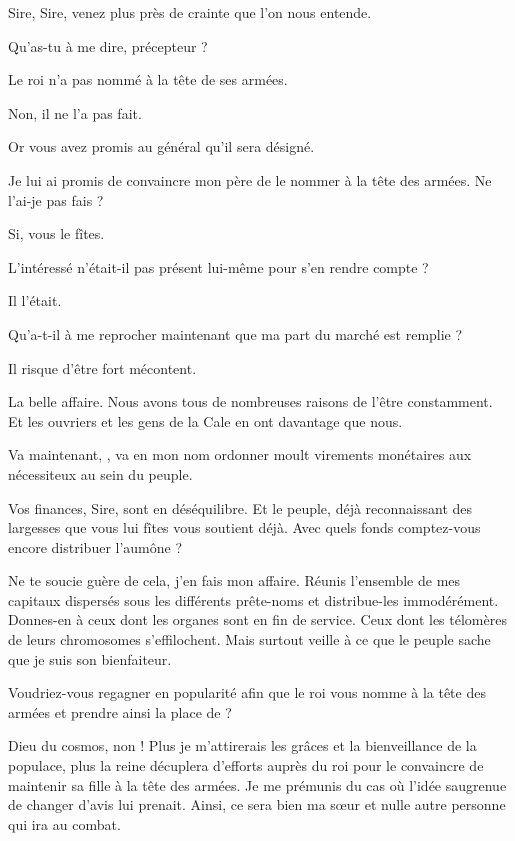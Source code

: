 \begin{drama}
  \alexasspeaks Sire, Sire, venez plus près de crainte que l’on nous entende.

  \elenaspeaks Qu’as-tu à me dire, précepteur ?

  \alexasspeaks Le roi n’a pas nommé \general à la tête de ses armées.

  \elenaspeaks Non, il ne l’a pas fait.

  \alexasspeaks Or vous avez promis au général qu’il sera désigné.

  \elenaspeaks Je lui ai promis de convaincre mon père de le nommer à la tête des armées. Ne l’ai-je pas fais ?

  \alexasspeaks Si, vous le fîtes.

  \elenaspeaks L’intéressé n’était-il pas présent lui-même pour s’en rendre compte ?

  \alexasspeaks Il l’était.

  \elenaspeaks Qu’a-t-il à me reprocher maintenant que ma part du marché est remplie ?

  \alexasspeaks Il risque d’être fort mécontent.

  \elenaspeaks La belle affaire. Nous avons tous de nombreuses raisons de l’être constamment. Et les ouvriers et les gens de la Cale en ont davantage que nous.

  Va maintenant, \alexas, va en mon nom ordonner moult virements monétaires aux nécessiteux au sein du peuple.

  \alexasspeaks Vos finances, Sire, sont en déséquilibre. Et le peuple, déjà reconnaissant des largesses que vous lui fîtes vous soutient déjà. Avec quels fonds comptez-vous encore distribuer l’aumône ?

  \elenaspeaks Ne te soucie guère de cela, j’en fais mon affaire. Réunis l’ensemble de mes capitaux dispersés sous les différents prête-noms et distribue-les immodérément. 
  Donnes-en à ceux dont les organes sont en fin de service. Ceux dont les télomères de leurs chromosomes s’effilochent. Mais surtout veille à ce que le peuple sache que je suis son bienfaiteur.

  \alexasspeaks Voudriez-vous regagner en popularité afin que le roi vous nomme à la tête des armées et prendre ainsi la place de \general ?

  \elenaspeaks Dieu du cosmos, non ! Plus je m’attirerais les grâces et la bienveillance de la populace, plus la reine décuplera d’efforts auprès du roi pour le convaincre de maintenir sa fille à la tête des armées. Je me prémunis du cas où  l’idée saugrenue de changer d’avis lui prenait. Ainsi, ce sera bien ma sœur et nulle autre personne qui ira au combat.


\end{drama}
